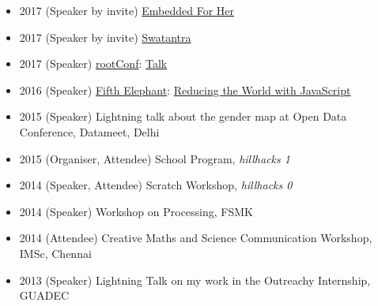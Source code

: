 \documentclass{scrartcl}
\newenvironment{myitemize}
{ \begin{itemize}
    \footnotesize\setlength{\itemsep}{0pt}
    \footnotesize\setlength{\parskip}{0pt}
    \footnotesize\setlength{\parsep}{0pt}     }
{ \end{itemize}                  }  %
\begin{document}
\begin{cv}{}
\centering{}
\begin{myitemize}
  \item {2017} {(Speaker by invite)} \href{https://twitter.com/fsmk_org/status/893756436139749382?s=17}{Embedded For Her}
  \item {2017} {(Speaker by invite)} \href{https://swatantra.net.in/#speakers}{Swatantra}
  \item {2017} {(Speaker)} \href{https://rootconf.talkfunnel.com/2017/72-spotswap-running-production-apis-on-spot-instances}{rootConf}: \href{https://www.youtube.com/watch?v=XQJ7YhVoSWI}{Talk}
  \item {2016} {(Speaker)} \href{https://fifthelephant.talkfunnel.com/2016/40-reducing-the-world-with-javascript}{Fifth Elephant}: \href{https://www.youtube.com/watch?v=KtUMS47TNNM}{Reducing the World with JavaScript}
  \item {2015} {(Speaker)} Lightning talk about the gender map at Open Data Conference, Datameet, Delhi
  \item {2015} {(Organiser, Attendee)} School Program, \textit{hillhacks 1}
  \item {2014} {(Speaker, Attendee)} Scratch Workshop, \textit{hillhacks 0}
  \item {2014} {(Speaker)} Workshop on Processing, FSMK
  \item {2014} {(Attendee)} Creative Maths and Science Communication Workshop, IMSc, Chennai
  \item {2013} {(Speaker)} Lightning Talk on my work in the Outreachy Internship, GUADEC 
\end{myitemize}


\end{cv}
\end{document}
